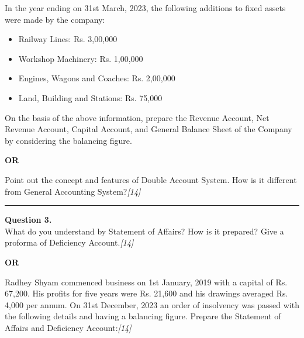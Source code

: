 \documentclass[11pt,a4paper]{article}
\newcommand{\pts}[1]{\hfill   \textit{[#1]}}
\begin{document}
In the year ending on 31st March, 2023, the following additions to fixed assets were made by the company:

\begin{itemize}[leftmargin=*]
  \item Railway Lines: Rs. 3,00,000
  \item Workshop Machinery: Rs. 1,00,000
  \item Engines, Wagons and Coaches: Rs. 2,00,000
  \item Land, Building and Stations: Rs. 75,000
\end{itemize}
On the basis of the above information, prepare the Revenue Account, Net Revenue Account, Capital Account, and General Balance Sheet of the Company by considering the balancing figure.

\centerline{   \textbf{OR}}

Point out the concept and features of Double Account System. How is it different from General Accounting System?\pts{14}

\medskip\rule{\linewidth}{0.2pt}

\pagebreak




\noindent   \textbf{Question 3.} \\
What do you understand by Statement of Affairs? How is it prepared? Give a proforma of Deficiency Account.\pts{14}

\centerline{   \textbf{OR}}

Radhey Shyam commenced business on 1st January, 2019 with a capital of Rs. 67,200. His profits for five years were Rs. 21,600 and his drawings averaged Rs. 4,000 per annum. On 31st December, 2023 an order of insolvency was passed with the following details and having a balancing figure. Prepare the Statement of Affairs and Deficiency Account:\pts{14}
\end{document}
